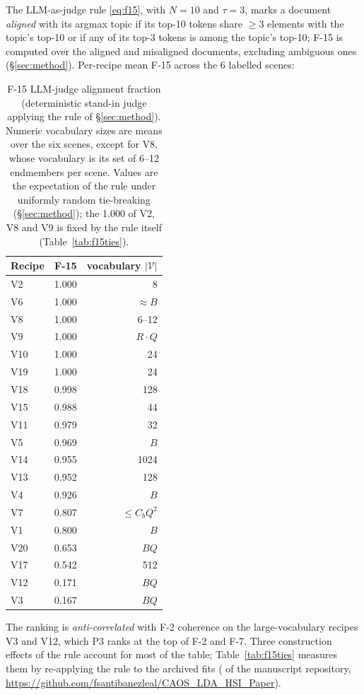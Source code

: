 \documentclass[journal,a4paper,10pt]{IEEEtran}
\begin{document}
The LLM-as-judge rule \eqref{eq:f15}, with $N=10$ and $\tau=3$, marks a
document \emph{aligned} with its argmax topic if its top-10 tokens
share $\geq 3$ elements with the topic's top-10 or if any of its top-3
tokens is among the topic's top-10; F-15 is computed over the aligned
and misaligned documents, excluding ambiguous ones (\S\ref{sec:method}).
Per-recipe mean F-15 across the 6 labelled scenes:

\begin{table}[ht]
\caption{F-15 LLM-judge alignment fraction (deterministic stand-in
judge applying the rule of \S\ref{sec:method}). Numeric vocabulary
sizes are means over the six scenes, except for V8, whose vocabulary
is its set of 6--12 endmembers per scene. Values are the expectation of
the rule under uniformly random tie-breaking (\S\ref{sec:method}); the
1.000 of V2, V8 and V9 is fixed by the rule itself
(Table~\ref{tab:f15ties}).}
\label{tab:f15}
\centering
\small
\begin{tabular}{lcr}
\toprule
Recipe & F-15 & vocabulary $|\mathcal{V}|$ \\
\midrule
V2  & 1.000 & 8 \\
V6  & 1.000 & $\approx B$ \\
V8  & 1.000 & 6--12 \\
V9  & 1.000 & $R \cdot Q$ \\
V10 & 1.000 & 24 \\
V19 & 1.000 & 24 \\
V18 & 0.998 & 128 \\
V15 & 0.988 & 44 \\
V11 & 0.979 & 32 \\
V5  & 0.969 & $B$ \\
V14 & 0.955 & 1024 \\
V13 & 0.952 & 128 \\
V4  & 0.926 & $B$ \\
V7  & 0.807 & $\le C_b Q^2$ \\
V1  & 0.800 & $B$ \\
V20 & 0.653 & $B Q$ \\
V17 & 0.542 & 512 \\
V12 & 0.171 & $B Q$ \\
V3  & 0.167 & $B Q$ \\
\bottomrule
\end{tabular}
\end{table}

The ranking is \emph{anti-correlated} with F-2 coherence on the
large-vocabulary recipes V3 and V12, which P3 ranks at the top of F-2
and F-7. Three construction effects of the rule account for most of the
table; Table~\ref{tab:f15ties} measures them by re-applying the rule to
the archived fits ( of the
manuscript repository,
\url{https://github.com/fsantibanezleal/CAOS_LDA_HSI_Paper}).
\end{document}

